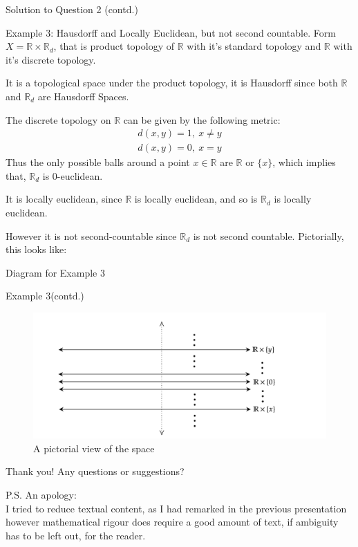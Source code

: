 \documentclass{beamer}
\begin{document}
\begin{frame}{Solution to Question 2 (contd.)}
\begin{block}{Example 3: Hausdorff and Locally Euclidean, but not second countable.}
Form $\displaystyle X=\mathbb{R} \times \mathbb{R}_{d}$, that is product topology of $\displaystyle \mathbb{R}$ with it's standard topology and $\displaystyle \mathbb{R}$ with it's discrete topology.

It is a topological space under the product topology, it is Hausdorff since both $\displaystyle \mathbb{R}$ and $\displaystyle \mathbb{R}_{d}$ are Hausdorff Spaces.

The discrete topology on $\displaystyle \mathbb{R}$ can be given by the following metric: 
\begin{gather*}
d( x,y) =1,\ x\neq y\\
d( x,y) =0,\ x=y
\end{gather*} 
Thus the only possible balls around a point $\displaystyle x\in \mathbb{R}$ are $\displaystyle \mathbb{R}$ or $\displaystyle \{x\}$, which implies that, $\displaystyle \mathbb{R}_{d}$ is $\displaystyle 0$-euclidean.

It is locally euclidean, since $\displaystyle \mathbb{R}$ is locally euclidean, and so is $\displaystyle \mathbb{R}_{d}$ is locally euclidean. 

However it is not second-countable since $\displaystyle \mathbb{R}_{d}$ is not second countable. 
Pictorially, this looks like:
\end{block}  
\end{frame}

\begin{frame}{Diagram for Example 3}
\begin{block}{Example 3(contd.)}
\begin{figure}
    \centering
    \includegraphics[width = 1.1\textwidth]{diag-4.png}
    \caption{A pictorial view of the space}
\end{figure}
\end{block}
\end{frame}
\begin{frame}{Thank you!}
    Any questions or suggestions?
    
    \alert{P.S. An apology:} \\
    I tried to reduce textual content, as I had remarked in the previous presentation however mathematical rigour does require a good amount of text, if ambiguity has to be left out, for the reader.
\end{frame}
\end{document}
